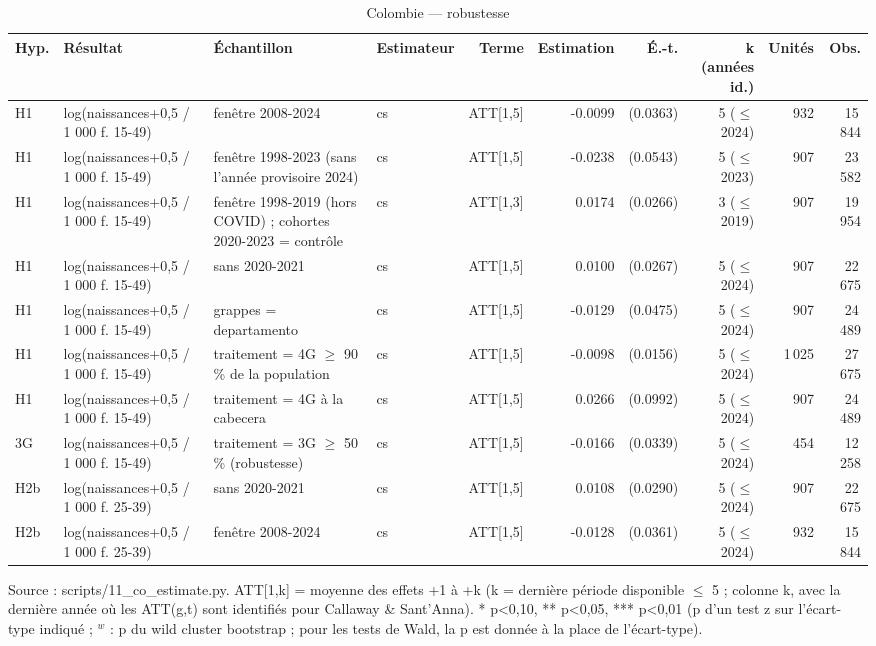 \begin{table}\centering
\begin{threeparttable}
\caption{Colombie — robustesse}\label{tab:co_robust}
\scriptsize
\begin{tabular}{lp{5.5cm}p{7.2cm}lrrrrrr}
\toprule
Hyp. & Résultat & Échantillon & Estimateur & Terme & Estimation & É.-t. & k (années id.) & Unités & Obs. \\
\midrule
H1 & log(naissances+0,5 / 1 000 f. 15-49) & fenêtre 2008-2024 & cs & ATT[1,5] & -0.0099 & (0.0363) & 5 ($\leq$ 2024) & 932 & 15\,844 \\
H1 & log(naissances+0,5 / 1 000 f. 15-49) & fenêtre 1998-2023 (sans l'année provisoire 2024) & cs & ATT[1,5] & -0.0238 & (0.0543) & 5 ($\leq$ 2023) & 907 & 23\,582 \\
H1 & log(naissances+0,5 / 1 000 f. 15-49) & fenêtre 1998-2019 (hors COVID) ; cohortes 2020-2023 = contrôle & cs & ATT[1,3] & 0.0174 & (0.0266) & 3 ($\leq$ 2019) & 907 & 19\,954 \\
H1 & log(naissances+0,5 / 1 000 f. 15-49) & sans 2020-2021 & cs & ATT[1,5] & 0.0100 & (0.0267) & 5 ($\leq$ 2024) & 907 & 22\,675 \\
H1 & log(naissances+0,5 / 1 000 f. 15-49) & grappes = departamento & cs & ATT[1,5] & -0.0129 & (0.0475) & 5 ($\leq$ 2024) & 907 & 24\,489 \\
H1 & log(naissances+0,5 / 1 000 f. 15-49) & traitement = 4G $\geq$ 90 \% de la population & cs & ATT[1,5] & -0.0098 & (0.0156) & 5 ($\leq$ 2024) & 1\,025 & 27\,675 \\
H1 & log(naissances+0,5 / 1 000 f. 15-49) & traitement = 4G à la cabecera & cs & ATT[1,5] & 0.0266 & (0.0992) & 5 ($\leq$ 2024) & 907 & 24\,489 \\
3G & log(naissances+0,5 / 1 000 f. 15-49) & traitement = 3G $\geq$ 50 \% (robustesse) & cs & ATT[1,5] & -0.0166 & (0.0339) & 5 ($\leq$ 2024) & 454 & 12\,258 \\
H2b & log(naissances+0,5 / 1 000 f. 25-39) & sans 2020-2021 & cs & ATT[1,5] & 0.0108 & (0.0290) & 5 ($\leq$ 2024) & 907 & 22\,675 \\
H2b & log(naissances+0,5 / 1 000 f. 25-39) & fenêtre 2008-2024 & cs & ATT[1,5] & -0.0128 & (0.0361) & 5 ($\leq$ 2024) & 932 & 15\,844 \\
\bottomrule
\end{tabular}
\begin{tablenotes}\footnotesize
\item Source : scripts/11\_co\_estimate.py. ATT[1,k] = moyenne des effets +1 à +k (k = dernière période disponible $\leq$ 5 ; colonne k, avec la dernière année où les ATT(g,t) sont identifiés pour Callaway \& Sant'Anna). * p<0,10, ** p<0,05, *** p<0,01 (p d'un test z sur l'écart-type indiqué ; $^{w}$ : p du wild cluster bootstrap ; pour les tests de Wald, la p est donnée à la place de l'écart-type).
\end{tablenotes}
\end{threeparttable}
\end{table}
